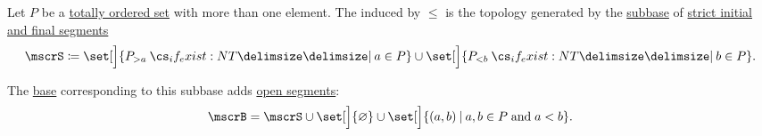\begin{definition}\label{def:order_topology}
  Let \( P \) be a \hyperref[def:partially_ordered_set]{totally ordered set} with more than one element. The  induced by \( \leq \) is the topology generated by the \hyperref[def:topological_subbase]{subbase} of \hyperref[def:order_interval/unbounded]{strict initial and final segments}
  \begin{equation}\label{eq:def:order_topology/subbase}
    \mscrS \coloneqq \set[\Big]{ P_{>a} \given* a \in P } \cup \set[\Big]{ P_{<b} \given* b \in P }.
  \end{equation}

  The \hyperref[def:topological_base]{base} corresponding to this subbase adds \hyperref[def:order_interval/open]{open segments}:
  \begin{equation}\label{eq:def:order_topology/base}
    \mscrB = \mscrS \cup \set[\Big]{ \varnothing } \cup \set[\Big]{ (a, b) \given a, b \in P \T{and} a < b }.
  \end{equation}
\end{definition}
